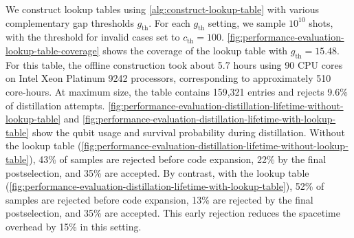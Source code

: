 We construct lookup tables using \autoref{alg:construct-lookup-table} with various complementary gap thresholds $g_\mathrm{th}$.
For each $g_\mathrm{th}$ setting, we sample $10^{10}$ shots, with the threshold for invalid cases set to $c_\mathrm{th} = 100$.
\autoref{fig:performance-evaluation-lookup-table-coverage} shows the coverage of the lookup table with $g_\mathrm{th} = 15.48$.
For this table, the offline construction took about 5.7 hours using 90 CPU cores on Intel Xeon Platinum 9242 processors, corresponding to approximately 510 core-hours.
At maximum size, the table contains 159,321 entries and rejects 9.6\% of distillation attempts.
\autoref{fig:performance-evaluation-distillation-lifetime-without-lookup-table} and \autoref{fig:performance-evaluation-distillation-lifetime-with-lookup-table} show the qubit usage and survival probability during distillation.
Without the lookup table (\autoref{fig:performance-evaluation-distillation-lifetime-without-lookup-table}), 43\% of samples are rejected before code expansion, 22\% by the final postselection, and 35\% are accepted.
By contrast, with the lookup table (\autoref{fig:performance-evaluation-distillation-lifetime-with-lookup-table}), 52\% of samples are rejected before code expansion, 13\% are rejected by the final postselection, and 35\% are accepted.
This early rejection reduces the spacetime overhead by 15\% in this setting.


